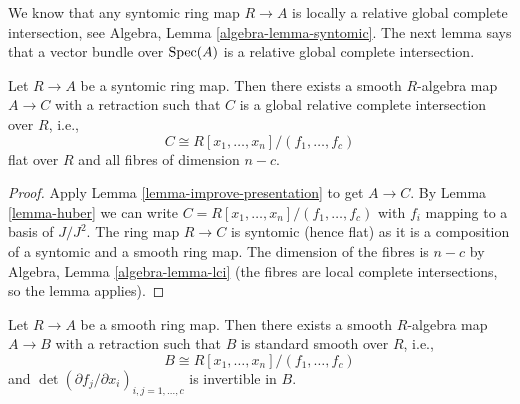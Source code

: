 \noindent
We know that any syntomic ring map $R \to A$ is locally a relative global
complete intersection, see
Algebra, Lemma \ref{algebra-lemma-syntomic}.
The next lemma says that a vector bundle over $\mathop{\rm Spec}(A)$ is
a relative global complete intersection.

\begin{lemma}
\label{lemma-syntomic-complete-intersection}
Let $R \to A$ be a syntomic ring map. Then there exists a smooth $R$-algebra
map $A \to C$ with a retraction such that $C$ is a global relative complete
intersection over $R$, i.e.,
$$
C \cong R[x_1, \ldots, x_n]/(f_1, \ldots, f_c)
$$
flat over $R$ and all fibres of dimension $n - c$.
\end{lemma}

\begin{proof}
Apply Lemma \ref{lemma-improve-presentation} to get $A \to C$.
By Lemma \ref{lemma-huber}
we can write $C = R[x_1, \ldots, x_n]/(f_1, \ldots, f_c)$
with $f_i$ mapping to a basis of $J/J^2$.
The ring map $R \to C$ is syntomic (hence flat)
as it is a composition of a syntomic and a smooth ring map.
The dimension of the fibres is $n - c$ by
Algebra, Lemma \ref{algebra-lemma-lci}
(the fibres are local complete intersections, so the lemma applies).
\end{proof}

\begin{lemma}
\label{lemma-smooth-standard-smooth}
Let $R \to A$ be a smooth ring map. Then there exists a smooth $R$-algebra
map $A \to B$ with a retraction such that $B$ is standard smooth over
$R$, i.e.,
$$
B \cong R[x_1, \ldots, x_n]/(f_1, \ldots, f_c)
$$
and $\det(\partial f_j/\partial x_i)_{i, j = 1, \ldots, c}$
is invertible in $B$.
\end{lemma}

